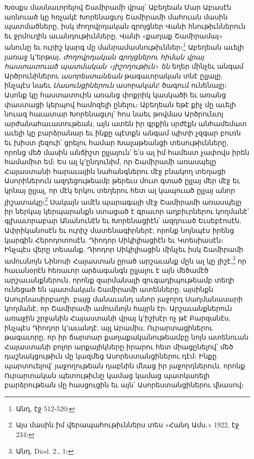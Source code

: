 \documentclass{article}
\begin{document}
{Խօսքս մասնաւորելով Շամիրամի վրայ՝ Աբեղեան Մար Աբասէն առնուած կը հռչակէ Խորենացւոյ Շամիրամի մահուան մասին պատմածները, իսկ ժողովրդական զրոյցներ Վանի հնութիւններուն եւ ջրմուղին աւանդութիւնները, Վանի «քաղաք Շամիրամայ» անունը եւ ուրիշ կարգ մը մանրամասնութիւններ։\footnote{Անդ, էջ 512֊520։} Աբեղեան աւելի յառաջ կ՚երթայ․ \emph{ժողովրդական գրոյցներու հիման վրայ հաստատուած պատմական «յիշողութիւն» են} եղեր մինչեւ անգամ Արծրունիներու \emph{ասորեստանեան} թագաւորական տնէ ըլլալը, ինչպէս նաեւ \emph{Սասունցիներուն} ասորական! ծագում ունենալը։ Ասոնք կը հաստատուին առանց փոքրիկ կասկածի եւ առանց փաստացի կերպով համոզելի ընելու։ Աբեղեան եթէ քիչ մը աւելի նուազ հաւատար Խորենացւոյ՝ հոս նաեւ թովմաս Արծրունւոյ արժանահաւատութեան, այն ատեն իր գրքին սրժէքն անհամեմատ աւելի կը բարձրանար եւ ինքը պէտքն անգամ պիտի չզգար բուռն եւ խիստ լեզուի՝ ցրելու համար Խալաթեանցի տեսութիւնները, որոնց մեծ մասին անճիշտ ըլլալուն՝ ե՛ս ալ իմ համեստ չափովս իրեն համամիտ եմ։ Ես ալ կ՚ընդունիմ, որ Շամիրամի առասպելը Հայաստանի հարաւային նահանգներու մէջ բնակող տեղացի Ասորիներուն ազդեցութեամբ թերեւս մուտ գտած ըլլայ մեր մէջ եւ կրնայ ըլլալ, որ մէկ երկու տեղերու հետ ալ կապուած ըլլայ անոր յիշատակը։\footnote{Այս մասին իմ վերապահութիւններս տես «Հանդ Ամս․» 1922, էջ 234։} Սակայն ամէն պարագայի մէջ Շամիրամի առասպելը իր ներկայ կերպարանքն ստացած է գրաւոր աղբիւրներու կողմանէ՝ գլխաւորաբար Անանունէն եւ Խորենացիէն՝ ազդուած Եւսեբէոսէն, Ափրիկանոսէն եւ ուրիշ մատենագիրներէ, որոնք նոյնպէս իրենց կարգին Հերոդոտոսէն, Դիոդոր Սիկիլիացիէն եւ Կտեսիասէն։ Ինչպէս վերը տեսանք, Դիոդոր Սիկիլիացին մինչեւ իսկ Շամիրամի ամուսնոյն Նինոսի Հայաստան ըրած արշաւանք մըն ալ կը յիշէ,\footnote{Անդ, Diod. 2., 1։} որ հաւանօրէն հեռաւոր արձագանգն ըլլալու է այն մեծամէծ արշաւանքներուն, որոնք զարմանալի զուգադիպութեամբ տեղի ունեցած են պատմական Շամիրամի ատենները, այսինքն Ասուրնասիրբաղի, բայց մանաւանդ անոր յաջորդ Սաղմանասարի կողմանէ, որ Շամիրամի ամուսնոյն հայրն էր։ Արշաւանքներուն առաջին շրջանին Հայաստանի վրայ կ՚իշխէր ոչ թէ Բարզանէս, ինչպէս Դիոդոր կ՚աւանդէ, այլ Արամիս, Ուրարտացիներու թագաւորը, որ իր ճարտար քաղաքականութեամբը նոյն ատենուան Հայաստանի բոլոր արքայիկները իրարու հետ միացընելով՝ մեծ դաշնակցութիւն մը կազմեց Ասորեստանցիներու դէմ։ Ինքը պարտուելով՝ յաջողութեան դաբնին մնաց իր յաջորդներուն, որոնք Ուրարտական պետութիւնը կամաց կամաց պատկառելի բարձրութեան մը հասցուցին եւ այն՝ Ասորեստանցիներու վնասով։

}
\end{document}

